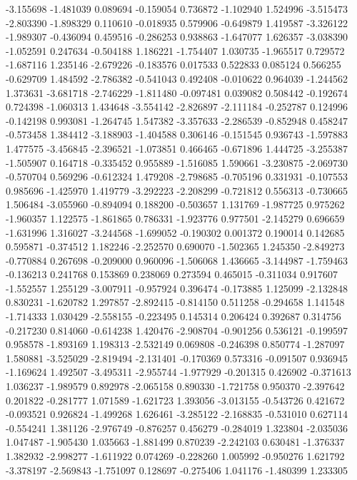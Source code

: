 -3.155698
-1.481039
0.089694
-0.159054
0.736872
-1.102940
1.524996
-3.515473
-2.803390
-1.898329
0.110610
-0.018935
0.579906
-0.649879
1.419587
-3.326122
-1.989307
-0.436094
0.459516
-0.286253
0.938863
-1.647077
1.626357
-3.038390
-1.052591
0.247634
-0.504188
1.186221
-1.754407
1.030735
-1.965517
0.729572
-1.687116
1.235146
-2.679226
-0.183576
0.017533
0.522833
0.085124
0.566255
-0.629709
1.484592
-2.786382
-0.541043
0.492408
-0.010622
0.964039
-1.244562
1.373631
-3.681718
-2.746229
-1.811480
-0.097481
0.039082
0.508442
-0.192674
0.724398
-1.060313
1.434648
-3.554142
-2.826897
-2.111184
-0.252787
0.124996
-0.142198
0.993081
-1.264745
1.547382
-3.357633
-2.286539
-0.852948
0.458247
-0.573458
1.384412
-3.188903
-1.404588
0.306146
-0.151545
0.936743
-1.597883
1.477575
-3.456845
-2.396521
-1.073851
0.466465
-0.671896
1.444725
-3.255387
-1.505907
0.164718
-0.335452
0.955889
-1.516085
1.590661
-3.230875
-2.069730
-0.570704
0.569296
-0.612324
1.479208
-2.798685
-0.705196
0.331931
-0.107553
0.985696
-1.425970
1.419779
-3.292223
-2.208299
-0.721812
0.556313
-0.730665
1.506484
-3.055960
-0.894094
0.188200
-0.503657
1.131769
-1.987725
0.975262
-1.960357
1.122575
-1.861865
0.786331
-1.923776
0.977501
-2.145279
0.696659
-1.631996
1.316027
-3.244568
-1.699052
-0.190302
0.001372
0.190014
0.142685
0.595871
-0.374512
1.182246
-2.252570
0.690070
-1.502365
1.245350
-2.849273
-0.770884
0.267698
-0.209000
0.960096
-1.506068
1.436665
-3.144987
-1.759463
-0.136213
0.241768
0.153869
0.238069
0.273594
0.465015
-0.311034
0.917607
-1.552557
1.255129
-3.007911
-0.957924
0.396474
-0.173885
1.125099
-2.132848
0.830231
-1.620782
1.297857
-2.892415
-0.814150
0.511258
-0.294658
1.141548
-1.714333
1.030429
-2.558155
-0.223495
0.145314
0.206424
0.392687
0.314756
-0.217230
0.814060
-0.614238
1.420476
-2.908704
-0.901256
0.536121
-0.199597
0.958578
-1.893169
1.198313
-2.532149
0.069808
-0.246398
0.850774
-1.287097
1.580881
-3.525029
-2.819494
-2.131401
-0.170369
0.573316
-0.091507
0.936945
-1.169624
1.492507
-3.495311
-2.955744
-1.977929
-0.201315
0.426902
-0.371613
1.036237
-1.989579
0.892978
-2.065158
0.890330
-1.721758
0.950370
-2.397642
0.201822
-0.281777
1.071589
-1.621723
1.393056
-3.013155
-0.543726
0.421672
-0.093521
0.926824
-1.499268
1.626461
-3.285122
-2.168835
-0.531010
0.627114
-0.554241
1.381126
-2.976749
-0.876257
0.456279
-0.284019
1.323804
-2.035036
1.047487
-1.905430
1.035663
-1.881499
0.870239
-2.242103
0.630481
-1.376337
1.382932
-2.998277
-1.611922
0.074269
-0.228260
1.005992
-0.950276
1.621792
-3.378197
-2.569843
-1.751097
0.128697
-0.275406
1.041176
-1.480399
1.233305
